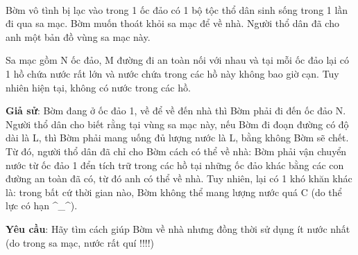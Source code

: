  

Bờm vô tình bị lạc vào trong 1 ốc đảo có 1 bộ tộc thổ dân sinh sống trong 1 lần đi qua sa mạc. Bờm muốn thoát khỏi sa mạc để về nhà. Người thổ dân đã cho anh một bản đồ vùng sa mạc này.

Sa mạc gồm N ốc đảo, M đường đi an toàn nối với nhau và tại mỗi ốc đảo lại có 1 hồ chứa nước rất lớn và nước chứa trong các hồ này không bao giờ cạn. Tuy nhiên hiện tại, không có nước trong các hồ.

\textbf{Giả sử}: Bờm đang ở ốc đảo 1, về để về đến nhà thì Bờm phải đi đến ốc đảo N. Người thổ dân cho biết rằng tại vùng sa mạc này, nếu Bờm đi đoạn đường có độ dài là L, thì Bờm phải mang uống đủ lượng nước là L, bằng không Bờm sẽ chết. Từ đó, người thổ dân đã chỉ cho Bờm cách có thể về nhà: Bờm phải vận chuyển nước từ ốc đảo 1 đển tích trữ trong các hồ tại những ốc đảo khác bằng các con đường an toàn đã có, từ đó anh có thể về nhà. Tuy nhiên, lại có 1 khó khăn khác là: trong bất cứ thời gian nào, Bờm không thể mang lượng nước quá C (do thể lực có hạn ^\_^).

\textbf{Yêu cầu}: Hãy tìm cách giúp Bờm về nhà nhưng đồng thời sử dụng ít nước nhất (do trong sa mạc, nước rất quí !!!!)